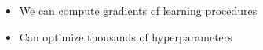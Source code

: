 \documentclass[landscape,a0b,final,a4resizeable]{include/a0poster}
\begin{document}
\begin{poster}
\begin{multicols}{3}


\begin{itemize}
\item We can compute gradients of learning procedures
\item Can optimize thousands of hyperparameters
\end{itemize}



\end{multicols}
\end{poster}
\end{document}
